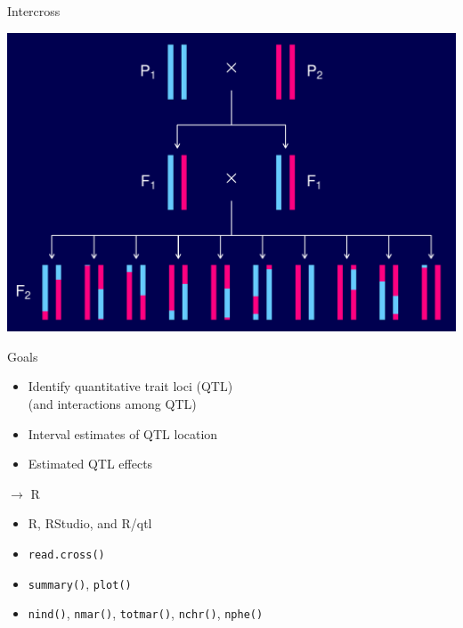 \documentclass[12pt]{article}
\newcommand{\headsize}{\fontsize{35}{35} \selectfont}
\newcommand{\smallsize}{\fontsize{25}{30} \selectfont}
\begin{document}
\headsize \color{myyellow}
\hfill \begin{minipage}{5.75in}
\centering
Intercross
\end{minipage}

\vfill

\centerline{\includegraphics{FigsA/intercross.pdf}}

\newpage

\headsize \color{myyellow}
\hfill \begin{minipage}{5.75in}
\centering
Goals
\end{minipage}

\vspace{3cm}

\color{mywhite} \smallsize

\hfill \begin{minipage}[t]{9.5in}
\begin{itemize}
\itemsep24pt
\item Identify quantitative trait loci (QTL)\\[6pt]
   {\color{myblue}   (and interactions among QTL)}
\item Interval estimates of QTL location
\item Estimated QTL effects
\end{itemize} \end{minipage}


\newpage

\headsize \color{myyellow}
$\boldsymbol{\rightarrow}$ R

\vspace{3cm}

\color{mywhite} \smallsize

\hfill \begin{minipage}[t]{9.5in}
\begin{itemize}
\itemsep24pt
\item R, RStudio, and R/qtl
\item \verb|read.cross()|
\item \verb|summary()|, \verb|plot()|
\item \verb|nind()|, \verb|nmar()|, \verb|totmar()|, \verb|nchr()|, \verb|nphe()|
\end{itemize} \end{minipage}
\end{document}
